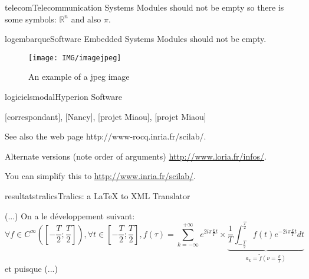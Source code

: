 \documentclass{ra2011}
\begin{document}
\begin{module}{}{telecom}{Telecommunication Systems}
Modules should not be empty so there is  some symbols: $\mathbb{R}^n$ and also $\pi$.
\end{module}

\begin{module}{}{logembarque}{Software Embedded Systems}
Modules should not be empty.

\begin{figure}
\begin{center}
\texttt{[image: IMG/imagejpeg]}
\end{center}
\caption{An example of a jpeg image}
\label{fig:jpegimage}
\end{figure}

\end{module}



\begin{module}{logiciels}{modal}{Hyperion Software} 
\begin{participants}
  [correspondant],
  [Nancy],
  [projet Miaou],
  [projet Miaou]
\end{participants}

See also the web page
{http://www-rocq.inria.fr/scilab/}.

Alternate versions (note order of arguments)
\href{http://www.loria.fr/info/}{\url{http://www.loria.fr/infos/}}.

You can simplify this to 
\url{http://www.inria.fr/scilab/}.
\end{module}



\begin{module}{resultats}{tralics}{Tralics: a LaTeX to XML Translator}

(...) On a le développement suivant:
\[ \forall f\in C^\infty\left(\left[-\frac{T}{2};\frac{T}{2}\right]\right),
   \forall t\in \left[-\frac{T}{2};\frac{T}{2}\right],
   f(\tau) = \sum_{k = -\infty}^{+\infty} e^{2i\pi\frac{k}{T}t} \times
   \underbrace{\frac{1}{T}
               \int_{-\frac{T}{2}}^{\frac{T}{2}} f(t) e^{-2i\pi\frac{k}{T}t} dt
              }_{a_k = \tilde{f}\left(\nu = \frac{k}{T}\right)}
\]
et puisque (...)

\end{module}
\end{document}
